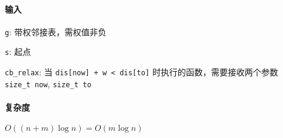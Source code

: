 \paragraph{输入}

\verb|g|: 带权邻接表，需权值非负

\verb|s|: 起点

\verb|cb_relax|: 当 \verb|dis[now] + w < dis[to]| 时执行的函数，需要接收两个参数 \verb|size_t now|, \verb|size_t to|

\paragraph{复杂度}

\(O((n+m)\log n)=O(m\log n)\)
